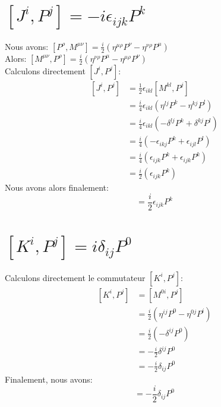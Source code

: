 \documentclass[12pt, a4paper]{article}
\begin{document}
 \section{\([J^{i},P^{j}]=-i\epsilon_{ijk}P^{k}\)}
 Nous avons: \([P^{\rho},M^{\mu \nu}]=\frac{i}{2} (\eta^{\mu\rho}P^{\nu}-\eta^{\nu\rho}P^{\mu})\)\\
 Alors: \([M^{\mu \nu},P^{\rho}]=\frac{i}{2}(\eta^{\nu\rho}P^{\mu}-\eta^{\mu\rho}P^{\nu})\)\\
 Calculons directement \([J^{i},P^{j}]\):
  \begin{equation}
 	\begin{split}
 		[J^{i},P^{j}]
 		&=\frac{1}{2}\epsilon_{ikl}[M^{k l},P^{j}]\\
 		&=\frac{i}{4}\epsilon_{ikl}(\eta^{lj}P^{k}-\eta^{kj}P^{l})\\
 		&=\frac{i}{4}\epsilon_{ikl}(-\delta^{lj}P^{k}+\delta^{kj}P^{l})\\
 		&=\frac{i}{4}(-\epsilon_{ikj}P^{k}+\epsilon_{ijl}P^{l})\\
 		&=\frac{i}{4}(\epsilon_{ijk}P^{k}+\epsilon_{ijk}P^{k})\\
 		&=\frac{i}{2}(\epsilon_{ijk}P^{k})
 	\end{split}
 \end{equation}
 Nous avons alors finalement: 
 \begin{equation}
 	[J^{i},P^{j}]=\frac{i}{2}\epsilon_{ijk}P^{k}
 \end{equation}
 
 \section{\([K^{i},P^{j}]=i\delta_{ij}P^{0}\)}
 Calculons directement le commutateur \([K^{i},P^{j}]\):
 \begin{equation}
 	\begin{split}
 		[K^{i},P^{j}]
 		&=[M^{0i}, P^{j}]\\
 		&= \frac{i}{2}(\eta^{ij}P^{0}-\eta^{0j}P^{i})\\
 		&= \frac{i}{2}(-\delta^{ij}P^{0})\\
 		&=-\frac{i}{2}\delta^{ij}P^{0}\\
 		&=-\frac{i}{2}\delta_{ij}P^{0}
 	\end{split}
 \end{equation}
 Finalement, nous avons: 
 \begin{equation}
 	[K^{i},P^{j}]=-\frac{i}{2}\delta_{ij}P^{0}
 \end{equation}
 
\end{document}
